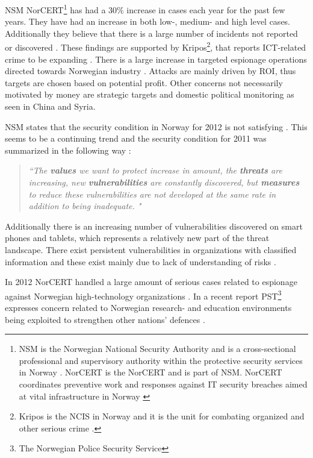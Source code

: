 \acs{NSM} \acs{NorCERT}\footnote{\acs{NSM} is the Norwegian National Security Authority and is a cross-sectional professional and supervisory authority within the protective security services in Norway \cite{AboutNSM}. \acs{NorCERT} is the \acl{NorCERT} and is part of \acs{NSM}. \acs{NorCERT} coordinates preventive work and responses against IT security breaches aimed at vital infrastructure in Norway \cite{AboutNorCERT}} has had a 30\% increase in cases each year for the past few years. They have had an increase in both low-, medium- and high level cases. Additionally they believe that there is a large number of incidents not reported or discovered \cite{NorCERT3Kvartal2012}. These findings are supported by Kripos\footnote{Kripos is the \ac{NCIS} in Norway and it is the unit for combating organized and other serious crime \cite{policeInNorway}.}, that reports ICT-related crime to be expanding \cite{KriposTrender}. There is a large increase in targeted espionage operations directed towards Norwegian industry \cite{NSMRapport2012}. Attacks are mainly driven by \ac{ROI}, thus targets are chosen based on potential profit. Other concerns not necessarily motivated by money are strategic targets and domestic political monitoring as seen in China and Syria\cite{Morketall2012}.

\acs{NSM} states that the security condition in Norway for 2012 is not satisfying \cite{samordnaVurdering}. This seems to be a continuing trend and the security condition for 2011 was summarized in the following way \cite{NSMRapport}: 

\begin{quote}
\textit{``The \textbf{values} we want to protect increase in amount, the \textbf{threats} are increasing, new \textbf{vulnerabilities} are constantly discovered, but \textbf{measures} to reduce these vulnerabilities are not developed at the same rate in addition to being inadequate. "}
\end{quote}

Additionally there is an increasing number of vulnerabilities discovered on smart phones and tablets, which represents a relatively new part of the threat landscape. There exist persistent vulnerabilities in organizations with classified information and these exist mainly due to lack of understanding of risks \cite{NSMRapport2012}.

In 2012 \acs{NorCERT} handled a large amount of serious cases related to espionage against Norwegian high-technology organizations \cite{NorCERT3Kvartal2012}. In a recent report PST\footnote{The Norwegian Police Security Service} expresses concern related to Norwegian research- and education environments being exploited to strengthen other nations' defences \cite{PSTvurdering2013}.   

